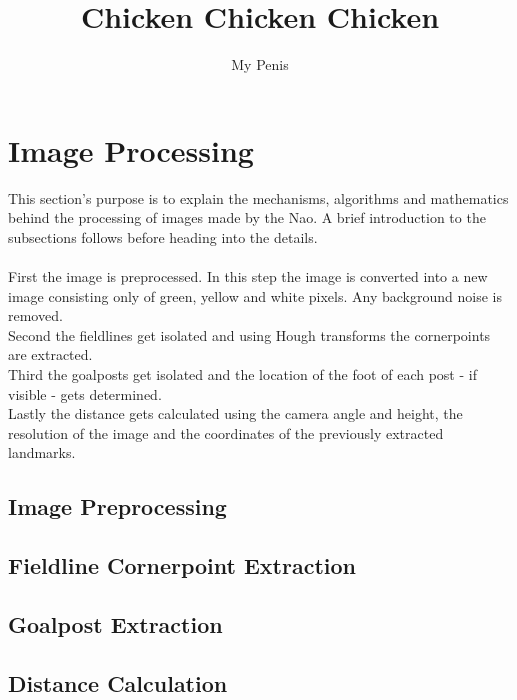 \documentclass[twocolumn]{article}
\author{My Penis}
\title{Chicken Chicken Chicken}
\begin{document}
\maketitle

\section{Image Processing}
This section's purpose is to explain the mechanisms, algorithms and mathematics behind the processing of images made by the Nao.
A brief introduction to the subsections follows before heading into the details.\\ \\
First the image is preprocessed. In this step the image is converted into a new image consisting only of green, yellow and white pixels. Any background noise is removed.\\
Second the fieldlines get isolated and using Hough transforms the cornerpoints are extracted.\\
Third the goalposts get isolated and the location of the foot of each post - if visible - gets determined.\\
Lastly the distance gets calculated using the camera angle and height, the resolution of the image and the coordinates of the previously extracted landmarks.

\subsection{Image Preprocessing}
\subsection{Fieldline Cornerpoint Extraction}
\subsection{Goalpost Extraction}
\subsection{Distance Calculation}
\end{document}
